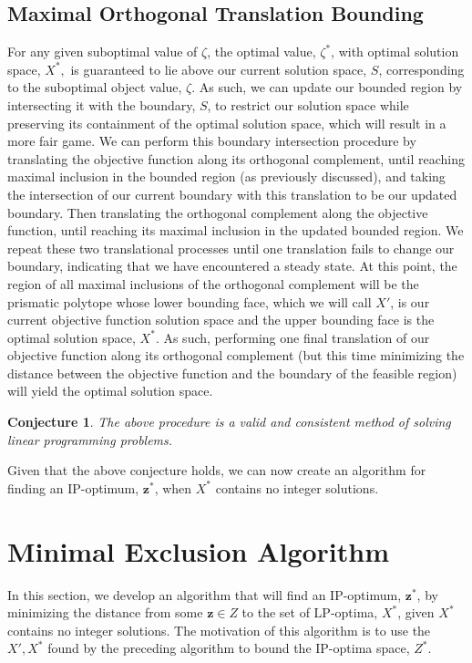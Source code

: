 \documentclass[conference]{IEEEtran}
\numberwithin{equation}{section}
\numberwithin{figure}{section}
\theoremstyle{plain}
\newtheorem{conj}[equation]{Conjecture}
\theoremstyle{definition}
\newcommand{\1}{\ensuremath \mathbbm{1}}
\begin{document}
\subsection{Maximal Orthogonal Translation Bounding}
For any given suboptimal value of $\zeta$, the optimal value, $\zeta^*$, with 
optimal solution space, $X^*,$ is guaranteed to lie above our current solution 
space, $S$, corresponding to the suboptimal object value, $\zeta$. As such, we 
can update our bounded region by intersecting it with the boundary, $S$, to 
restrict our solution space while preserving its containment of the optimal 
solution space, which will result in a more fair game. We can perform this 
boundary intersection procedure by translating the objective function along its 
orthogonal complement, until reaching maximal inclusion in the bounded region (as 
previously discussed), and taking the intersection of our current boundary with 
this translation to be our updated boundary. Then translating the orthogonal 
complement along the objective function, until reaching its maximal inclusion in 
the updated bounded region. We repeat these two translational processes until 
one translation fails to change our boundary, indicating that we have encountered 
a steady state. At this point, the region of all maximal inclusions of the 
orthogonal complement will be the prismatic polytope whose lower bounding face, 
which we will call $X'$, is our current objective function solution space and the 
upper bounding face is the optimal solution space, $X^*$. As such, performing one 
final translation of our objective function along its orthogonal complement (but 
this time minimizing the distance between the objective function and the boundary 
of the feasible region) will yield the optimal solution space. \\
\begin{conj}
The above procedure is a valid and consistent method of solving linear 
programming problems. \\
\end{conj}
Given that the above conjecture holds, we can now create an algorithm for finding 
an IP-optimum, $\mathbf{z}^*$, when $X^*$ contains no integer solutions. \\

\section{Minimal Exclusion Algorithm}
In this section, we develop an algorithm that will find an IP-optimum, 
$\mathbf{z}^*$, by minimizing the distance from some $\mathbf{z} \in Z$ to the 
set of LP-optima, $X^*$, given $X^*$ contains no integer solutions. The 
motivation of this algorithm is to use the $X',X^*$ found by the preceding 
algorithm to bound the IP-optima space, $Z^*$. \\
\end{document}
